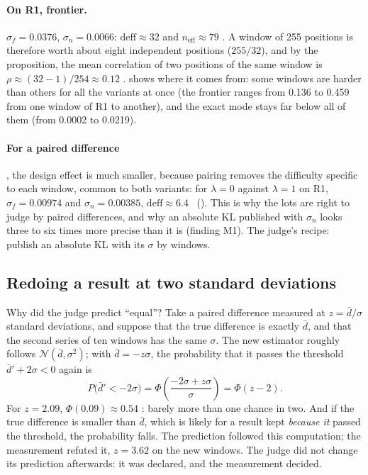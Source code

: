 \paragraph{On R1, frontier.} $\sigma_f = \num{0.0376}$, $\sigma_n = \num{0.0066}$: $\mathrm{deff} \approx 32$ and $n_{\text{eff}} \approx 79$ \calc. A window of 255 positions is therefore worth about eight independent positions ($255/32$), and by the proposition, the mean correlation of two positions of the same window is $\rho \approx (32 - 1)/254 \approx \num{0.12}$ \calc.  shows where it comes from: some windows are harder than others for all the variants at once (the frontier ranges from \num{0.136} to \num{0.459} from one window of R1 to another), and the exact mode stays far below all of them (from \num{0.0002} to \num{0.0219}).

\begin{figure}[tbp]
\centering
\GrapheJconsFenetres
{}
\label{fig:t3-jcons-fenetres}
\end{figure}

\paragraph{For a paired difference}, the design effect is much smaller, because pairing removes the difficulty specific to each window, common to both variants: for $\lambda = 0$ against $\lambda = 1$ on R1, $\sigma_f = \num{0.00974}$ and $\sigma_n = \num{0.00385}$, $\mathrm{deff} \approx \num{6.4}$ \calc\ (). This is why the lots are right to judge by paired differences, and why an absolute KL published with $\sigma_n$ looks three to six times more precise than it is (finding M1). The judge's recipe: publish an absolute KL with its $\sigma$ by windows.

\subsection{Redoing a result at two standard deviations}\label{t3jug:sec:refaire}

Why did the judge predict ``equal''? Take a paired difference measured at $z = \bar d/\sigma$ standard deviations, and suppose that the true difference is exactly $\bar d$, and that the second series of ten windows has the same $\sigma$. The new estimator roughly follows $\mathcal{N}(\bar d, \sigma^2)$; with $\bar d = -z\sigma$, the probability that it passes the threshold $\bar d' + 2\sigma < 0$ again is
\[
P\bigl(\bar d' < -2\sigma\bigr) = \Phi\!\left(\frac{-2\sigma + z\sigma}{\sigma}\right) = \Phi(z - 2).
\]
For $z = \num{2.09}$, $\Phi(\num{0.09}) \approx \num{0.54}$ \calc: barely more than one chance in two. And if the true difference is smaller than $\bar d$, which is likely for a result kept \emph{because it} passed the threshold, the probability falls. The prediction followed this computation; the measurement refuted it, $z = \num{3.62}$ on the new windows. The judge did not change its prediction afterwards: it was declared, and the measurement decided.

